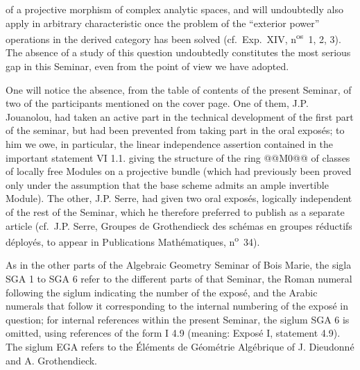 of a projective morphism of complex analytic spaces, and will undoubtedly also apply in arbitrary characteristic once the problem of the ``exterior power'' operations in the derived category has been solved (cf.\ Exp.\ XIV, n\textsuperscript{os}~1, 2, 3). The absence of a study of this question undoubtedly constitutes the most serious gap in this Seminar, even from the point of view we have adopted.

One will notice the absence, from the table of contents of the present Seminar, of two of the participants mentioned on the cover page. One of them, J.P. Jouanolou, had taken an active part in the technical development of the first part of the seminar, but had been prevented from taking part in the oral exposés; to him we owe, in particular, the linear independence assertion contained in the important statement VI 1.1. giving the structure of the ring @@M0@@ of classes of locally free Modules on a projective bundle (which had previously been proved only under the assumption that the base scheme admits an ample invertible Module). The other, J.P. Serre, had given two oral exposés, logically independent of the rest of the Seminar, which he therefore preferred to publish as a separate article (cf.\ J.P. Serre, Groupes de Grothendieck des schémas en groupes réductifs déployés, to appear in Publications Mathématiques, n\textsuperscript{o}~34).

As in the other parts of the Algebraic Geometry Seminar of Bois Marie, the sigla SGA 1 to SGA 6 refer to the different parts of that Seminar, the Roman numeral following the siglum indicating the number of the exposé, and the Arabic numerals that follow it corresponding to the internal numbering of the exposé in question; for internal references within the present Seminar, the siglum SGA 6 is omitted, using references of the form I 4.9 (meaning: Exposé I, statement 4.9). The siglum EGA refers to the Éléments de Géométrie Algébrique of J. Dieudonné and A. Grothendieck.

